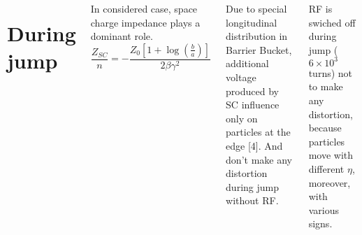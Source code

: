 \documentclass[25pt, a0paper, portrait, blockverticalspace=.5cm]{tikzposter}
\begin{document}
\begin{columns}
{	\section*{During jump}
		\begin{minipage}{0.5\linewidth}
		\par In considered case, space charge impedance plays a dominant role.
		\newline
		\begin{equation}
		\frac{Z_{SC}}{n}=-\frac{Z_0\left[1+\log \left(\frac{b}{a}\right)\right]}{2 \beta \gamma^2}
		\end{equation}
		\par Due to special longitudinal distribution in Barrier Bucket, additional voltage 
		produced by SC influence only on particles at the edge [4]. And don't make any distortion during jump without RF.
		\end{minipage}
		\begin{minipage}{0.5\linewidth}
		\end{minipage}

		\begin{minipage}{0.5\linewidth}
		\end{minipage}
		\begin{minipage}{0.5\linewidth}
		\par 
			
\end{minipage}
\par RF is swiched off during jump ($6\times10^3$ turns) not to make any distortion, because particles move with different $\eta$, moreover, with various signs.


}



\end{columns}
\end{document}
